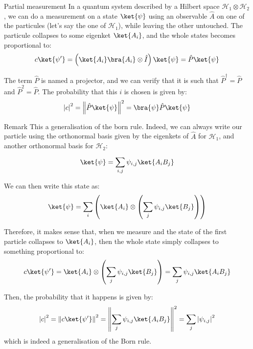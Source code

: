 \documentclass[a4paper]{article}
\begin{document}
\begin{parag}{Partial measurement}
    In a quantum system described by a Hilbert space $\mathcal{H}_1 \otimes \mathcal{H}_2$, we can do a measurement on a state $\ket{\psi}$ using an observable $\hat{A}$ on one of the particules (let's say the one of $\mathcal{H}_1$), while leaving the other untouched. The particule collapses to some eigenket $\ket{A_i}$, and the whole states becomes proportional to: 
    \[c \ket{\psi'} = \left(\ket{A_i}\bra{A_i} \otimes \hat{I}\right) \ket{\psi} = \hat{P} \ket{\psi}\]

    The term $\hat{P}$ is named a projector, and we can verify that it is such that $\hat{P}^{\dagger} = \hat{P}$ and $\hat{P}^2 = \hat{P}$. The probability that this $i$ is chosen is given by: 
    \[\left|c\right|^2 = \left\|\hat{P} \ket{\psi}\right\|^2 = \bra{\psi} \hat{P} \ket{\psi}\]

    \begin{subparag}{Remark}
        This a generalisation of the born rule. Indeed, we can always write our particle using the orthonormal basis given by the eigenkets of $\hat{A}$ for $\mathcal{H}_1$, and another orthonormal basis for $\mathcal{H}_2$: 
        \[\ket{\psi} = \sum_{i, j}^{} \psi_{i,j} \ket{A_i B_j}\]
        
        We can then write this state as: 
        \[\ket{\psi} = \sum_{i}^{} \left(\ket{A_i} \otimes \left(\sum_{j}^{} \psi_{i, j} \ket{B_j}\right)\right)\]
        
        Therefore, it makes sense that, when we measure and the state of the first particle collapses to $\ket{A_i}$, then the whole state simply collapses to something proportional to: 
        \[c\ket{\psi'} = \ket{A_i} \otimes \left(\sum_{j}^{} \psi_{i, j} \ket{B_j}\right) = \sum_{j}^{} \psi_{i, j}\ket{A_i B_j}\]

        Then, the probability that it happens is given by: 
        \[\left|c\right|^2 = \left\|c \ket{\psi'}\right\|^2 = \left\|\sum_{j}^{} \psi_{i, j}\ket{A_i B_j}\right\|^2 = \sum_{j} \left|\psi_{i, j}\right|^2\]
        which is indeed a generalisation of the Born rule.
    \end{subparag}
\end{parag}
\end{document}
